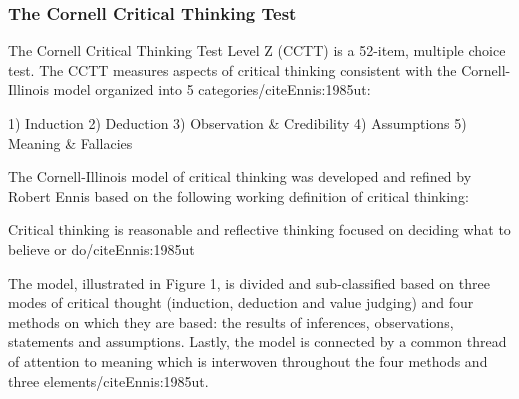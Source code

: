 \subsubsection{The Cornell Critical Thinking Test}

The Cornell Critical Thinking Test Level Z (CCTT) is a 52-item, multiple choice test. The CCTT measures aspects of critical thinking consistent with the Cornell-Illinois model organized into 5 categories/cite{Ennis:1985ut}:

1)	Induction
2)	Deduction
3)	Observation & Credibility
4)	Assumptions
5)	Meaning & Fallacies

The Cornell-Illinois model of critical thinking was developed and refined by Robert Ennis based on the following working definition of critical thinking:

Critical thinking is reasonable and reflective thinking focused on deciding what to believe or do/cite{Ennis:1985ut}

The model, illustrated in Figure 1, is divided and sub-classified based on three modes of critical thought (induction, deduction and value judging) and four methods on which they are based: the results of inferences, observations, statements and assumptions. Lastly, the model is connected by a common thread of attention to meaning which is interwoven throughout the four methods and three elements/cite{Ennis:1985ut}. 

